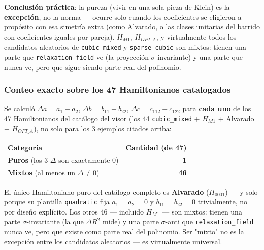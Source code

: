 \documentclass[11pt, a4paper]{article}
\newcommand{\TH}[1]{\cellcolor{cTHbg}\color{white}\textbf{#1}}
\newcommand{\good}[1]{\color{cGood}\textbf{#1}}
\newcommand{\bad}[1]{\color{cBad}\textbf{#1}}
\begin{document}
\begin{tcolorbox}[quotebox]
  \textbf{Conclusi\'on pr\'actica}: la pureza (vivir en una sola pieza
  de Klein) es la \textbf{excepci\'on}, no la norma --- ocurre solo
  cuando los coeficientes se eligieron a prop\'osito con esa simetr\'ia
  extra (como Alvarado, o las clases unitarias del barrido con
  coeficientes iguales por pareja). $H_{M1}$, $H_{OPT\_A}$, y
  virtualmente todos los candidatos aleatorios de \texttt{cubic\_mixed}
  y \texttt{sparse\_cubic} son mixtos: tienen una parte que
  \texttt{relaxation\_field} ve (la proyecci\'on $\sigma$-invariante) y
  una parte que nunca ve, pero que sigue siendo parte real del
  polinomio.
\end{tcolorbox}

\subsubsection{Conteo exacto sobre los 47 Hamiltonianos catalogados}

Se calcul\'o $\Delta a=a_1{-}a_2$, $\Delta b=b_{11}{-}b_{22}$,
$\Delta c=c_{112}{-}c_{122}$ para \textbf{cada uno} de los 47
Hamiltonianos del cat\'alogo del visor (los 44 \texttt{cubic\_mixed} +
$H_{M1}$ + Alvarado + $H_{OPT\_A}$), no solo para los 3 ejemplos
citados arriba:

\medskip
\begin{center}
\begin{tabular}{lr}
  \TH{Categor\'ia} & \TH{Cantidad (de 47)} \\[1pt]
  \good{Puros} (los 3 $\Delta$ son exactamente 0) & \good{1} \\
  \bad{Mixtos} (al menos un $\Delta\neq0$) & \bad{46} \\
\end{tabular}
\end{center}
\medskip

\begin{tcolorbox}[quotebox]
  El \'unico Hamiltoniano puro del cat\'alogo completo es
  \textbf{Alvarado} ($H_{0001}$) --- y solo porque su plantilla
  \texttt{quadratic} fija $a_1=a_2=0$ y $b_{11}=b_{22}=0$
  trivialmente, no por dise\~no expl\'icito. Los otros 46 --- incluido
  $H_{M1}$ --- son mixtos: tienen una parte $\sigma$-invariante (la que
  $\Delta R^2$ mide) y una parte $\sigma$-anti que \texttt{relaxation\_field}
  nunca ve, pero que existe como parte real del polinomio. Ser
  "mixto" no es la excepci\'on entre los candidatos aleatorios --- es
  virtualmente universal.
\end{tcolorbox}
\end{document}
